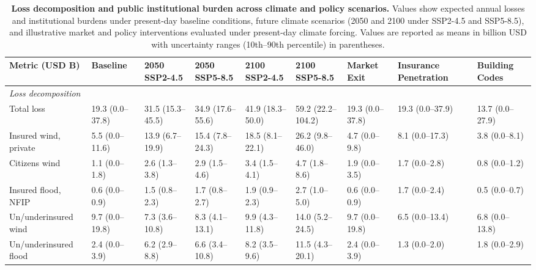 \documentclass[fleqn,10pt]{wlscirep}
\begin{document}
\begin{landscape}
\begin{table}[htb!]
\centering
\caption{\textbf{Loss decomposition and public institutional burden across climate and policy scenarios.}
Values show expected annual losses and institutional burdens under present-day baseline conditions, future climate scenarios (2050 and 2100 under SSP2-4.5 and SSP5-8.5), and illustrative market and policy interventions evaluated under present-day climate forcing. Values are reported as means in billion USD with uncertainty ranges (10th--90th percentile) in parentheses.}
\label{TabClimatePolicyLosses}

\small
\setlength{\tabcolsep}{4pt}

\begin{tabular}{@{}l|l|llll|lll@{}}
\toprule
\textbf{Metric (USD B)} &
\textbf{Baseline} &
\textbf{2050 SSP2-4.5} &
\textbf{2050 SSP5-8.5} &
\textbf{2100 SSP2-4.5} &
\textbf{2100 SSP5-8.5} &
\textbf{Market Exit} &
\textbf{Insurance Penetration} &
\textbf{Building Codes} \\
\midrule

\multicolumn{9}{l}{\textit{Loss decomposition}} \\
Total loss                         & 19.3 (0.0--37.8) & 31.5 (15.3--45.5) & 34.9 (17.6--55.6) & 41.9 (18.3--50.0) & 59.2 (22.2--104.2) & 19.3 (0.0--37.8) & 19.3 (0.0--37.9) & 13.7 (0.0--27.9) \\
Insured wind, private            & 5.5 (0.0--11.6) & 13.9 (6.7--19.9) & 15.4 (7.8--24.3) & 18.5 (8.1--22.1) & 26.2 (9.8--46.0) & 4.7 (0.0--9.8) & 8.1 (0.0--17.3) & 3.8 (0.0--8.1) \\
Citizens wind                      & 1.1 (0.0--1.8) & 2.6 (1.3--3.8) & 2.9 (1.5--4.6) & 3.4 (1.5--4.1) & 4.7 (1.8--8.6) & 1.9 (0.0--3.5) & 1.7 (0.0--2.8) & 0.8 (0.0--1.2) \\
Insured flood, NFIP              & 0.6 (0.0--0.9) & 1.5 (0.8--2.3) & 1.7 (0.8--2.7) & 1.9 (0.9--2.3) & 2.7 (1.0--5.0) & 0.6 (0.0--0.9) & 1.7 (0.0--2.4) & 0.5 (0.0--0.7) \\
Un/underinsured wind               & 9.7 (0.0--19.8) & 7.3 (3.6--10.8) & 8.3 (4.1--13.1) & 9.9 (4.3--11.8) & 14.0 (5.2--24.5) & 9.7 (0.0--19.8) & 6.5 (0.0--13.4) & 6.8 (0.0--13.8) \\
Un/underinsured flood              & 2.4 (0.0--3.9) & 6.2 (2.9--8.8) & 6.6 (3.4--10.8) & 8.2 (3.5--9.6) & 11.5 (4.3--20.1) & 2.4 (0.0--3.9) & 1.3 (0.0--2.0) & 1.8 (0.0--2.9) \\


\end{tabular}
\end{table}
\end{landscape}
\end{document}
